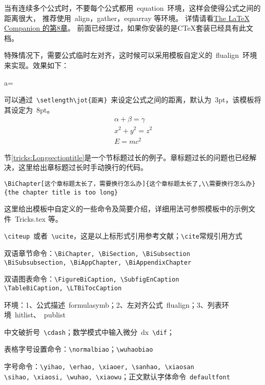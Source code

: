 当有连续多个公式时，不要每个公式都用~equation~环境，这样会使得公式之间的距离很大，
推荐使用~align，gather，eqnarray 等环境。
详情请看\href{ftp://ftp.ctex.org/pub/tex/documents/bible/LaTeX_Companion_ch8.zip}{The LaTeX Companion 的第8章}。
前面已经提过，如果你安装的是CTeX套装已经具有此文档。

特殊情况下，需要公式临时左对齐，这时候可以采用模板自定义的~flualign~环境来实现。效果如下：
\begin{flualign}
a=\delta
\end{flualign}

可以通过~\verb"\setlength\jot{距离}"~来设定公式之间的距离，默认为~3pt，该模板将其设定为~8pt。
\begin{gather}
\alpha + \beta = \gamma\\
x^2+y^2=z^2\\
E=mc^2
\end{gather}

\label{tricks:Longsectiontitle}

节\ref{tricks:Longsectiontitle}是一个节标题过长的例子。章标题过长的问题也已经解决，这里给出章标题过长时手动换行的代码。
\begin{verbatim}\BiChapter[这个章标题太长了，需要换行怎么办]{这个章标题太长了,\\需要换行怎么办}
{the chapter title is too long}\end{verbatim}

这里给出模板中自定义的一些命令及简要介绍，详细用法可参照模板中的示例文件~Tricks.tex 等。
\begin{hitlist}
\item \verb+\citeup+~或者~\verb+\ucite+，这是以上标形式引用参考文献；\verb+\cite+常规引用方式
\item 双语章节命令：\verb+\BiChapter, \BiSection, \BiSubsection+\\
\verb+\BiSubsubsection, \BiAppChapter, \BiAppendixChapter+
\item 双语图表命令：\verb+\FigureBiCaption, \SubfigEnCaption+\\
\verb+\TableBiCaption, \LTBiTocCaption+
\item 环境：1、公式描述~formulasymb；2、左对齐公式~flualign；3、列表环境~hitlist、~publist 
\item 中文破折号~\verb+\cdash+；数学模式中输入微分~dx~\verb+\dif+；
\item 表格字号设置命令：\verb+\normalbiao+；\verb+\wuhaobiao+
\item 字号命令：\verb+\yihao, \erhao, \xiaoer, \sanhao, \xiaosan+\\
\verb+\sihao, \xiaosi, \wuhao, \xiaowu+；正文默认字体命令~\verb+defaultfont+
\end{hitlist}


